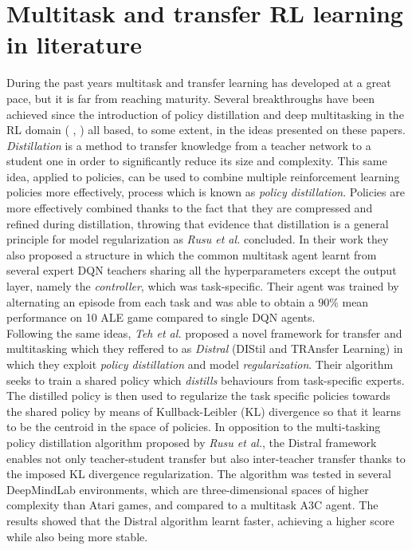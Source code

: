 \documentclass{article}
\begin{document}
\section{Multitask and transfer RL learning in literature}
During the past years multitask and transfer learning has developed at a great pace, but it is far from reaching maturity. Several breakthroughs have been achieved since the introduction of policy distillation and deep multitasking in the RL domain ( \citep{RusuPOLICYDISTILLATION}, \citep{Parisotto2015Actor-Mimic:Learning})  all based, to some extent, in the ideas presented on these papers.\\
\newline
\textit{Distillation} is a method to transfer knowledge from a teacher network to a student one \citep{RusuPOLICYDISTILLATION} in order to significantly reduce its size and complexity. This same idea, applied to policies, can be used to combine multiple reinforcement learning policies more effectively, process which is known as \textit{policy distillation}. Policies are more effectively combined thanks to the fact that they are compressed and refined during distillation, throwing that evidence that distillation is a general principle for model regularization as \textit{Rusu et al.} concluded. In their work they also proposed a structure in which the common multitask agent learnt from several expert DQN teachers sharing all the hyperparameters except the output layer, namely the \textit{controller}, which was task-specific. Their agent was trained by alternating an episode from each task and was able to obtain a $90\%$ mean performance on 10 ALE game compared to single DQN agents.\\
\newline
Following the same ideas, \textit{Teh et al.} \citep{Teh2017Distral:Learning} proposed a novel framework for transfer and multitasking which they reffered to as \textit{Distral} (DIStil and TRAnsfer Learning) in which they exploit \textit{policy distillation} and model \textit{regularization}. Their algorithm seeks to train a shared policy which \textit{distills} behaviours from task-specific experts. The distilled policy is then used to regularize the task specific policies towards the shared policy by means of Kullback-Leibler (KL) divergence so that it learns to be the centroid in the space of policies. In opposition to the multi-tasking policy distillation algorithm proposed by \textit{Rusu et al.}, the Distral framework enables not only teacher-student transfer but also inter-teacher transfer thanks to the imposed KL divergence regularization. The algorithm was tested in several DeepMindLab environments, which are three-dimensional spaces of higher complexity than Atari games, and compared to a multitask A3C agent. The results showed that the Distral algorithm learnt faster, achieving a higher score while also being more stable.\\
\end{document}
